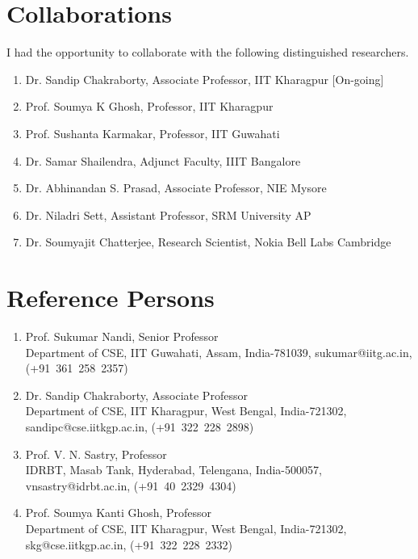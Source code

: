 \documentclass{article}
\begin{document}
\section{Collaborations}
I had the opportunity to collaborate with the following distinguished researchers.
  \begin{enumerate}
  	\item Dr. Sandip Chakraborty, Associate Professor, IIT Kharagpur [On-going]
	\item Prof. Soumya K Ghosh, Professor, IIT Kharagpur
	\item Prof. Sushanta Karmakar, Professor, IIT Guwahati
	\item Dr. Samar Shailendra, Adjunct Faculty, IIIT Bangalore
	\item Dr. Abhinandan S. Prasad, Associate Professor, NIE Mysore
	\item Dr. Niladri Sett, Assistant Professor, SRM University AP
	\item Dr. Soumyajit Chatterjee, Research Scientist, Nokia Bell Labs Cambridge
  \end{enumerate}
\section{Reference Persons}
  \begin{enumerate}
  \item Prof. Sukumar Nandi, Senior Professor\\Department of CSE, IIT Guwahati, Assam, India-781039, sukumar@iitg.ac.in, (+91~361~258~2357)
  \item Dr. Sandip Chakraborty, Associate Professor\\Department of CSE, IIT Kharagpur, West Bengal, India-721302, sandipc@cse.iitkgp.ac.in, (+91~322~228~2898)
  \item Prof. V. N. Sastry, Professor\\IDRBT, Masab Tank, Hyderabad, Telengana, India-500057, vnsastry@idrbt.ac.in, (+91~40~2329~4304)
  \item Prof. Soumya Kanti Ghosh, Professor\\Department of CSE, IIT Kharagpur, West Bengal, India-721302, skg@cse.iitkgp.ac.in, (+91~322~228~2332)
  \end{enumerate}
  
  
\end{document}
